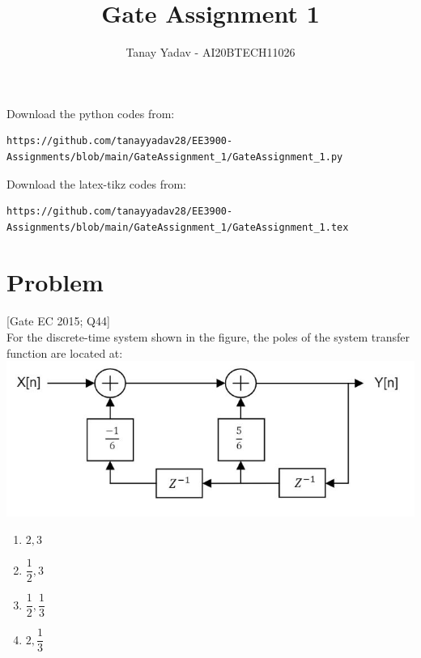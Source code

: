 \documentclass[journal,12pt,twocolumn]{IEEEtran}
\begin{document}
\let\vec\mathbf
\renewcommand{\thefigure}{\theproblem}
\def\putbox#1#2#3{\makebox[0in][l]{\makebox[#1][l]{}\raisebox{\baselineskip}[0in][0in]{\raisebox{#2}[0in][0in]{#3}}}}
     \def\rightbox#1{\makebox[0in][r]{#1}}
     \def\centbox#1{\makebox[0in]{#1}}
     \def\topbox#1{\raisebox{-\baselineskip}[0in][0in]{#1}}
     \def\midbox#1{\raisebox{-0.5\baselineskip}[0in][0in]{#1}}
\vspace{3cm}
\title{Gate Assignment 1}
\author{Tanay Yadav - AI20BTECH11026}
\maketitle
\newpage
\bigskip
\renewcommand{\thefigure}{\theenumi}
\renewcommand{\thetable}{\theenumi}
Download the python codes from: 
%
\begin{lstlisting}
https://github.com/tanayyadav28/EE3900-Assignments/blob/main/GateAssignment_1/GateAssignment_1.py
\end{lstlisting}
Download the latex-tikz codes from: 
%
\begin{lstlisting}
https://github.com/tanayyadav28/EE3900-Assignments/blob/main/GateAssignment_1/GateAssignment_1.tex
\end{lstlisting}
\section{Problem}
[Gate EC 2015; Q44]
\\For the discrete-time system shown in the figure, the poles of the system transfer function are located at:
\includegraphics[scale = 0.6]{Q44_img.JPG}
\begin{enumerate}
\setlength\itemsep{0.7em}
    \item $2,3$
    \item $\dfrac{1}{2},3$
    \item $\dfrac{1}{2},\dfrac{1}{3}$
    \item $2,\dfrac{1}{3}$
\end{enumerate}
\end{document}
